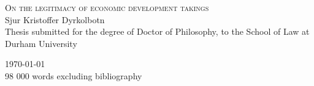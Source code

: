 \begin{titlepage}

\begin{center}



\vspace*{\fill}
\centering

{\Huge\textsc{On the legitimacy of economic development takings}}\\[3cm]


{Sjur Kristoffer Dyrkolbotn}\\

\large {Thesis submitted for the degree of Doctor of Philosophy, to the School of Law at Durham University} \\

\vspace*{\fill}

 

\vfill

{\Large \today}\\
{98 000 words excluding bibliography}

\end{center}

\end{titlepage}
